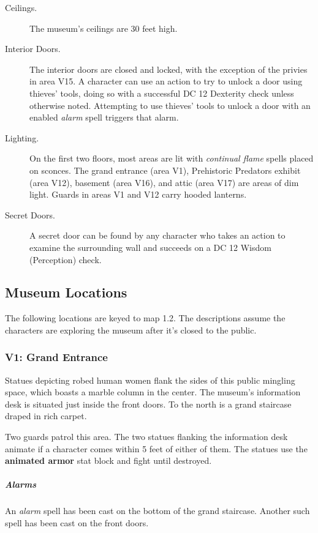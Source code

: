 \documentclass[10pt,a4paper,twoside,bg=print,twocolumn,openany,nodeprecatedcode]{dndbook}
\begin{document}
\begin{description}
\item[Ceilings.]
The museum's ceilings are 30 feet high.
\item[Interior Doors.]
The interior doors are closed and locked, with the exception of the privies in area V15. A character can use an action to try to unlock a door using thieves' tools, doing so with a successful DC 12 Dexterity check unless otherwise noted. Attempting to use thieves' tools to unlock a door with an enabled \textit{alarm} spell triggers that alarm.
\item[Lighting.]
On the first two floors, most areas are lit with \textit{continual flame} spells placed on sconces. The grand entrance (area V1), Prehistoric Predators exhibit (area V12), basement (area V16), and attic (area V17) are areas of dim light. Guards in areas V1 and V12 carry hooded lanterns.
\item[Secret Doors.]
A secret door can be found by any character who takes an action to examine the surrounding wall and succeeds on a DC 12 Wisdom (Perception) check.
\end{description}

\subsection{Museum Locations}
The following locations are keyed to map 1.2. The descriptions assume the characters are exploring the museum after it's closed to the public.

\subsubsection{V1: Grand Entrance}
\begin{DndReadAloud}{}
Statues depicting robed human women flank the sides of this public mingling space, which boasts a marble column in the center. The museum's information desk is situated just inside the front doors. To the north is a grand staircase draped in rich carpet.

\end{DndReadAloud}

Two guards patrol this area. The two statues flanking the information desk animate if a character comes within 5 feet of either of them. The statues use the \textbf{animated armor} stat block and fight until destroyed.

\subparagraph{Alarms}
An \textit{alarm} spell has been cast on the bottom of the grand staircase. Another such spell has been cast on the front doors.
\end{document}
